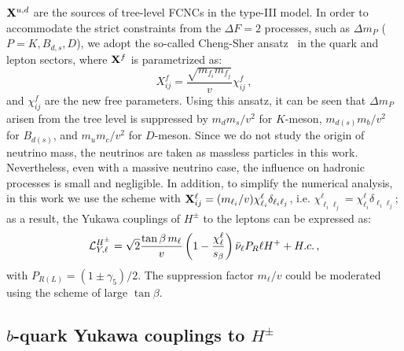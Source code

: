 \documentclass[prd,preprint,superscriptaddress,amsmath,amssymb]{revtex4}
\begin{document}
${\bf X}^{u,d}$ are the sources of tree-level FCNCs in the type-III model. In order to accommodate the strict constraints from the $\Delta F=2$ processes, such as $\Delta m_{P}$ ($P=K,B_{d,s},D$),  we adopt the so-called Cheng-Sher  ansatz~\cite{Cheng:1987rs} in the quark and lepton sectors, where ${\bf X}^f$ is  parametrized as: 
 \begin{equation}
X^f_{ij} =\frac{ \sqrt{m_{f_i} m_{f_j}}}{v} \chi^f_{ij}\,, \label{eq:CSA}
 \end{equation}
 and  $\chi^f_{ij}$ are the new free parameters.  Using this ansatz, it can be seen that $\Delta m_{P}$ arisen from the tree level is suppressed by $m_d m_s/v^2$ for $K$-meson, $m_{d(s)}m_b/v^2$ for $B_{d(s)}$, and $m_u m_c/v^2$ for $D$-meson.
Since we do not study the origin of neutrino mass, the neutrinos are taken as massless particles in this work. Nevertheless, even with a massive neutrino case, the influence on hadronic processes is small and negligible. In addition, to simplify the numerical analysis, in this work we use  the scheme with ${\bf X}^\ell_{ij} = (m_{\ell_i} /v )  \chi^\ell_{\ell_i} \delta_{\ell_i \ell_j}$, i.e. $\chi^\ell_{\ell_i \ell_j} = \chi^\ell_{\ell_i}  \delta_{\ell_i \ell_j}$; as a result, the Yukawa couplings of $H^\pm$ to the leptons can be expressed as:
  \begin{equation}
  {\cal L}^{H^\pm}_{Y,\ell} = \sqrt{2} \frac{\tan\beta \, m_\ell}{v} \left(1 - \frac{\chi^{\ell}_{\ell} }{s_\beta} \right) \bar \nu_{\ell }  P_R \ell  H^+ + H.c.\,, \label{eq:Clepton}
  \end{equation}
 with $P_{R(L)}=(1 \pm \gamma_5)/2$. The suppression factor $m_\ell /v$ could be moderated using the scheme of large $\tan\beta$. 

\subsection{  $b$-quark Yukawa couplings to $H^\pm$}
\end{document}
